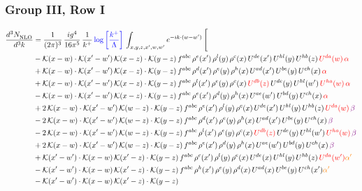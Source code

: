 \documentclass[9pt]{article}
\numberwithin{equation}{section}
\begin{document}
\subsubsection{Group III, Row I}
\begin{align}
     \frac{d^{3}N_{\rm NLO}^{\rm}}{d^{3}k}  & = \frac{1}{(2\pi)^{3}}\, \frac{ig^{4}}{16\pi^{5}}\, \frac{1}{k^{+}}\, {\color{blue}\log{\left[\frac{k^{+}}{\Lambda}\right]}}\, \int_{x,y,z,x^{\prime},w,w^{\prime}}e^{-ik\cdot (w-w')}\, \Bigg[\notag \\ & -\mathcal{K}(x-w)\cdot \mathcal{K}(x'-w')\, \mathcal{K}(x-z)\cdot \mathcal{K}(y-z)\, f^{abc}\, \rho^{e}(x')\,\rho^{l}(y)\,\rho^{c}(x)\,U^{de}(x')\,U^{hl}(y)\,U^{hb}(z)\,{\color{red}U^{da}(w)}\, {\color{red}\alpha} \notag \\ & +\mathcal{K}(x-w)\cdot \mathcal{K}(x'-w')\, \mathcal{K}(x-z)\cdot \mathcal{K}(y-z)\, f^{abc}\, \rho^{d}(x')\,\rho^{e}(y)\,\rho^{h}(x)\,U^{ad}(x')\,U^{be}(y)\,U^{ch}(x)\, {\color{red}\alpha} \notag \\ & + \mathcal{K}(x-w)\cdot \mathcal{K}(x'-w')\, \mathcal{K}(x-z)\cdot \mathcal{K}(y-z)\, f^{abc}\, \rho^{l}(x')\,\rho^{e}(y)\,\rho^{c}(x)\,{\color{red}U^{db}(z)}\,U^{de}(y)\,U^{hl}(w')\,{\color{red}U^{ha}(w)}\, {\color{red}\alpha} \notag \\ & -\mathcal{K}(x-w)\cdot \mathcal{K}(x'-w')\, \mathcal{K}(x-z)\cdot \mathcal{K}(y-z)\, f^{abc}\, \rho^{e}(x')\,\rho^{d}(y)\,\rho^{h}(x)\,U^{ae}(w')\,U^{bd}(y)\,U^{ch}(x)\, {\color{red}\alpha} \notag \\ & +2\, \mathcal{K}(x-w)\cdot \mathcal{K}(x'-w')\, \mathcal{K}(w-z) \cdot \mathcal{K}(y-z)\, f^{abc}\, \rho^{e}(x')\,\rho^{l}(y)\, \rho^{c}(x)\, U^{de}(x')\,U^{hl}(y)\,U^{hb}(z)\,{\color{red}U^{da}(w)}\, {\color{violet} \beta} \notag \\ & -2\, \mathcal{K}(x-w)\cdot \mathcal{K}(x'-w')\, \mathcal{K}(w-z) \cdot \mathcal{K}(y-z)\, f^{abc}\, \rho^{d}(x')\,\rho^{e}(y)\, \rho^{h}(x)\, U^{ad}(x')\,U^{be}(y)\,U^{ch}(x)\, {\color{violet} \beta}\notag \\ & -2\, \mathcal{K}(x-w)\cdot \mathcal{K}(x'-w')\, \mathcal{K}(w-z) \cdot \mathcal{K}(y-z)\, f^{abc}\, \rho^{l}(x')\,\rho^{e}(y)\, \rho^{c}(x)\, {\color{red}U^{db}(z)}\,U^{de}(y)\,U^{hl}(w')\,{\color{red}U^{ha}(w)}\, {\color{violet} \beta}\notag \\ & + 2\, \mathcal{K}(x-w)\cdot \mathcal{K}(x'-w')\, \mathcal{K}(w-z) \cdot \mathcal{K}(y-z)\, f^{abc}\, \rho^{e}(x')\,\rho^{d}(y)\, \rho^{h}(x)\, U^{ae}(w')\,U^{bd}(y)\,U^{ch}(x)\, {\color{violet} \beta}\notag \\ & +\mathcal{K}(x'-w')\cdot\mathcal{K}(x-w)\,\mathcal{K}(x'-z)\cdot\mathcal{K}(y-z)\, f^{abc}\,\rho^{c}(x')\,\rho^{l}(y)\,\rho^{e}(x)\,U^{de}(x)\,U^{hl}(y)\,U^{hb}(z)\,{\color{red}U^{da}(w')}{\color{orange} \alpha'}\notag\\ &-\mathcal{K}(x'-w')\cdot\mathcal{K}(x-w)\,\mathcal{K}(x'-z)\cdot\mathcal{K}(y-z)\, f^{abc}\,\rho^{h}(x')\,\rho^{e}(y)\,\rho^{d}(x)\,U^{ad}(x)\,U^{be}(y)\,U^{ch}(x'){\color{orange} \alpha'}\notag\\ &-\mathcal{K}(x'-w')\cdot\mathcal{K}(x-w)\,\mathcal{K}(x'-z)\cdot\mathcal{K}(y-z)\, 
\end{align}
\end{document}
